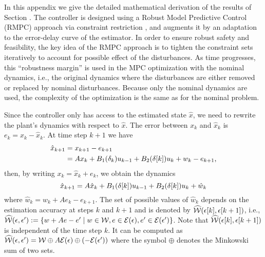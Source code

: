 
In this appendix we give the detailed mathematical derivation of the results of Section \ctrlProbSecRef.
The controller is designed using a Robust Model Predictive
Control (RMPC) approach via constraint restriction \cite{richardsetal05rmp, chiscietal01swp}, 
and augments it by an adaptation to the error-delay curve of the estimator.
In order to ensure robust safety and feasibility, the key idea of
the RMPC approach is to tighten the constraint sets iteratively to account
for possible effect of the disturbances. 
As time progresses, this ``robustness
margin'' is used in the MPC optimization with the nominal dynamics,
i.e., the original dynamics where the disturbances are either removed
or replaced by nominal disturbances.
Because only the nominal dynamics are used, the complexity of the optimization is the same as for the nominal problem.

Since the controller only has access to the estimated state $\hat{x}$, we need
to rewrite the plant's dynamics with respect to $\hat{x}$. 
The error
between $ $$x_{k}$ and $\hat{x}_{k}$ is $e_{k}=x_{k}-\hat{x}_{k}$.
At time step $k+1$ we have
\begin{align*}
\hat{x}_{k+1} & =x_{k+1}-e_{k+1}\\
 & =Ax_{k}+B_{1}(\delta_k)u_{k-1}+B_{2}(\delta[k])u_{k}+w_{k}-e_{k+1}\text{,}
\end{align*}
 then, by writing $x_{k}=\hat{x}_{k}+e_{k}$, we obtain the dynamics
\begin{equation}
\hat{x}_{k+1}=A\hat{x}_{k}+B_{1}(\delta[k])u_{k-1}+B_{2}(\delta[k])u_{k}+\hat{w}_{k}\label{eq:estimator-dynamics}
\end{equation}
 where $\hat{w}_{k}=w_{k}+Ae_{k}-e_{k+1}$.
The set of possible values of $\hat{w}_{k}$
depends on the estimation accuracy at steps $k$ and $k+1$ and is
denoted by $\widehat{\mathcal{W}}(\epsilon[k],\epsilon[k+1])$, i.e.,
$\widehat{\mathcal{W}}(\epsilon,\epsilon'):= \left\{ w+Ae-e'\;|\; w\in\mathcal{W},e\in\mathcal{E}(\epsilon),e'\in\mathcal{E}(\epsilon')\right\}$.
Note that %
$\widehat{\mathcal{W}}(\epsilon[k],\epsilon[k+1])$ is independent
of the time step $k$. %
It can be computed as $\widehat{\mathcal{W}}(\epsilon,\epsilon')=\mathcal{W}\oplus A\mathcal{E}(\epsilon)\oplus\left(-\mathcal{E}(\epsilon')\right)$
where the symbol $\oplus$ denotes the Minkowski sum of two sets.

